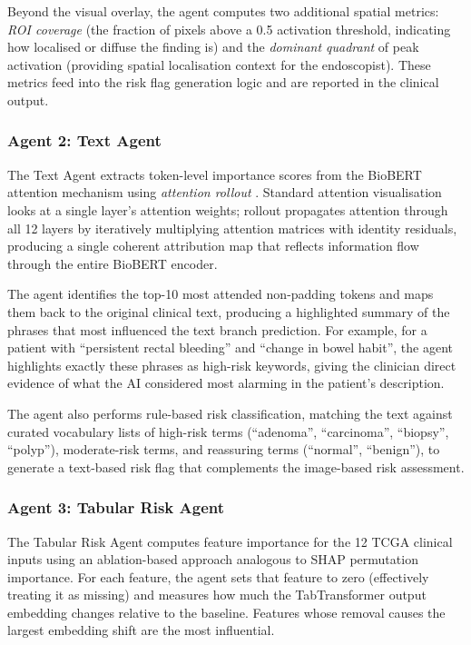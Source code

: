 \documentclass[conference]{IEEEtran}
\begin{document}
Beyond the visual overlay, the agent computes two additional spatial metrics:
\emph{ROI coverage} (the fraction of pixels above a 0.5 activation threshold,
indicating how localised or diffuse the finding is) and the \emph{dominant
quadrant} of peak activation (providing spatial localisation context for the
endoscopist). These metrics feed into the risk flag generation logic and are
reported in the clinical output.

\subsubsection{Agent 2: Text Agent}

The Text Agent extracts token-level importance scores from the BioBERT
attention mechanism using \emph{attention rollout} \cite{abnar2020}. Standard
attention visualisation looks at a single layer's attention weights; rollout
propagates attention through all 12 layers by iteratively multiplying
attention matrices with identity residuals, producing a single coherent
attribution map that reflects information flow through the entire BioBERT
encoder.

The agent identifies the top-10 most attended non-padding tokens and
maps them back to the original clinical text, producing a highlighted
summary of the phrases that most influenced the text branch prediction.
For example, for a patient with ``persistent rectal bleeding'' and ``change
in bowel habit'', the agent highlights exactly these phrases as high-risk
keywords, giving the clinician direct evidence of what the AI considered
most alarming in the patient's description.

The agent also performs rule-based risk classification, matching the
text against curated vocabulary lists of high-risk terms (``adenoma'',
``carcinoma'', ``biopsy'', ``polyp''), moderate-risk terms, and reassuring
terms (``normal'', ``benign''), to generate a text-based risk flag that
complements the image-based risk assessment.

\subsubsection{Agent 3: Tabular Risk Agent}

The Tabular Risk Agent computes feature importance for the 12 TCGA clinical
inputs using an ablation-based approach analogous to SHAP permutation
importance. For each feature, the agent sets that feature to zero (effectively
treating it as missing) and measures how much the TabTransformer output
embedding changes relative to the baseline. Features whose removal causes
the largest embedding shift are the most influential.
\end{document}
